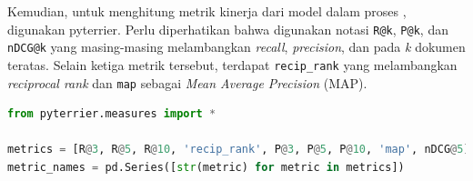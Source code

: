 Kemudian, untuk menghitung metrik kinerja dari model dalam proses \retrieval{}, digunakan \library{} pyterrier. Perlu diperhatikan bahwa digunakan notasi \lstinline{R@k}, \lstinline{P@k}, dan \lstinline{nDCG@k} yang masing-masing melambangkan \textit{recall}, \textit{precision}, dan \ndcg{} pada \textit{k} dokumen teratas. Selain ketiga metrik tersebut, terdapat \lstinline{recip_rank} yang melambangkan \textit{reciprocal rank} dan \lstinline{map} sebagai \textit{Mean Average Precision} (MAP).
\begin{lstlisting}[language=Python, caption={Metrik evaluasi}, label={kode:metrics}]
from pyterrier.measures import *

metrics = [R@3, R@5, R@10, 'recip_rank', P@3, P@5, P@10, 'map', nDCG@5]
metric_names = pd.Series([str(metric) for metric in metrics])
\end{lstlisting}

